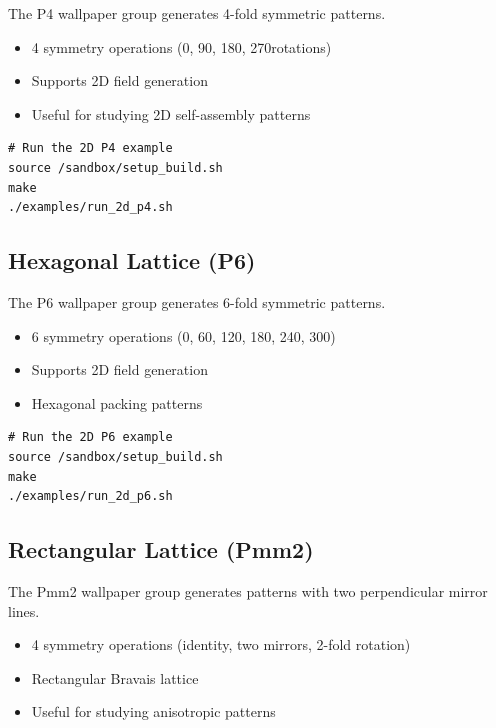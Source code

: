 The P4 wallpaper group generates 4-fold symmetric patterns.

\begin{itemize}
    \item 4 symmetry operations (0\textdegree, 90\textdegree, 180\textdegree, 270\textdegree rotations)
    \item Supports 2D field generation
    \item Useful for studying 2D self-assembly patterns
\end{itemize}

\begin{verbatim}
# Run the 2D P4 example
source /sandbox/setup_build.sh
make
./examples/run_2d_p4.sh
\end{verbatim}

\subsection{Hexagonal Lattice (P6)}

The P6 wallpaper group generates 6-fold symmetric patterns.

\begin{itemize}
    \item 6 symmetry operations (0\textdegree, 60\textdegree, 120\textdegree, 180\textdegree, 240\textdegree, 300\textdegree)
    \item Supports 2D field generation
    \item Hexagonal packing patterns
\end{itemize}

\begin{verbatim}
# Run the 2D P6 example
source /sandbox/setup_build.sh
make
./examples/run_2d_p6.sh
\end{verbatim}

\subsection{Rectangular Lattice (Pmm2)}

The Pmm2 wallpaper group generates patterns with two perpendicular mirror lines.

\begin{itemize}
    \item 4 symmetry operations (identity, two mirrors, 2-fold rotation)
    \item Rectangular Bravais lattice
    \item Useful for studying anisotropic patterns
\end{itemize}

